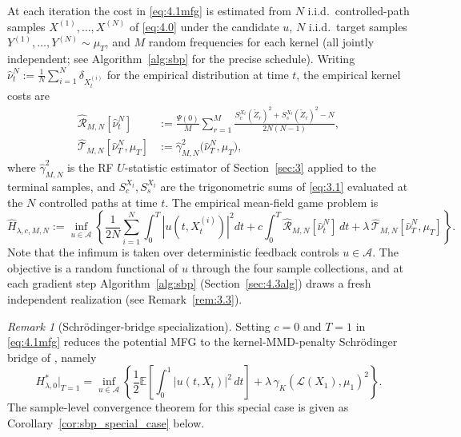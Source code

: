 \documentclass[11pt,leqno]{article}
\theoremstyle{plain}
\theoremstyle{remark}
\newtheorem{rem}[thm]{Remark}
\theoremstyle{definition}
\numberwithin{equation}{section}
\numberwithin{figure}{section}
\numberwithin{table}{section}
\numberwithin{algorithm}{section}
\newcommand{\EE}{\mathbb{E}}
\begin{document}
At each iteration the cost in \eqref{eq:4.1mfg} is estimated from $N$ i.i.d.\ controlled-path samples
$X^{(1)},\ldots,X^{(N)}$ of \eqref{eq:4.0} under the candidate $u$,
$N$ i.i.d.\ target samples $Y^{(1)},\ldots,Y^{(N)}\sim\mu_T$,
and $M$ random frequencies for each kernel
(all jointly independent; see Algorithm~\ref{alg:sbp} for the precise schedule).
Writing $\hat\nu^N_t := \frac{1}{N}\sum_{i=1}^N\delta_{X^{(i)}_t}$ for the empirical distribution at time $t$,
the empirical kernel costs are
\begin{align}
\label{eq:4.empF}
 \hat{\mathcal{R}}_{M,N}[\hat\nu^N_t]
 &:= \frac{\Psi(0)}{M}\sum_{r=1}^M\frac{S_c^{X_t}(\tilde Z_r)^2 + S_s^{X_t}(\tilde Z_r)^2 - N}{2N(N-1)},\\
\label{eq:4.empG}
 \hat{\mathcal{T}}_{M,N}[\hat\nu^N_T,\mu_T]
 &:= \hat\gamma_{M,N}^2\bigl(\hat\nu^N_T,\mu_T\bigr),
\end{align}
where $\hat\gamma_{M,N}^2$ is the RF $U$-statistic estimator of Section~\ref{sec:3}
applied to the terminal samples,
and $S_c^{X_t}, S_s^{X_t}$ are the trigonometric sums of \eqref{eq:3.1} evaluated at the $N$ controlled paths at time $t$.
The empirical mean-field game problem is
\begin{equation}\label{eq:4.2}
 \hat H_{\lambda,c,M,N}
 := \inf_{u\in\mathcal{A}}\left\{
 \frac{1}{2N}\sum_{i=1}^N\int_0^T|u(t,X^{(i)}_t)|^2 dt
 + c\int_0^T\hat{\mathcal{R}}_{M,N}[\hat\nu^N_t]\,dt
 + \lambda\,\hat{\mathcal{T}}_{M,N}[\hat\nu^N_T,\mu_T]\right\}.
\end{equation}
Note that the infimum is taken over deterministic feedback controls $u\in\mathcal{A}$. 
The objective is a random functional of $u$ through the four sample collections,
and at each gradient step Algorithm~\ref{alg:sbp} (Section~\ref{sec:4.3alg})
draws a fresh independent realization (see Remark~\ref{rem:3.3}).

\begin{rem}[Schr{\"o}dinger-bridge specialization]\label{rem:sbp_specialization}
Setting $c=0$ and $T=1$ in \eqref{eq:4.1mfg} reduces the potential MFG to the kernel-MMD-penalty Schr{\"o}dinger bridge of \cite{nak:2024sb}, namely
\begin{equation}\label{eq:4.1sbp}
 H^*_{\lambda,0}\bigr|_{T=1}
 = \inf_{u\in\mathcal{A}}\left\{\frac{1}{2}\EE\left[\int_0^1|u(t,X_t)|^2\,dt\right]
 + \lambda\,\gamma_K(\mathcal{L}(X_1),\mu_1)^2\right\}.
\end{equation}
The sample-level convergence theorem for this special case is given as Corollary~\ref{cor:sbp_special_case} below.
\end{rem}
\end{document}
